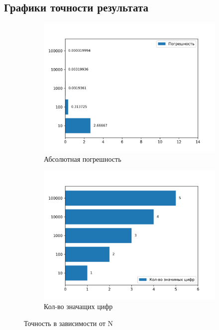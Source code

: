 \documentclass[a4paper,12pt]{article}
\begin{document}
\subsection{Графики точности результата}
\begin{figure}[H]
\centering
\begin{subfigure}{.5\textwidth}
  \centering
  \includegraphics[width=\linewidth]{plots/series_error.png}
  \caption{Абсолютная погрешность}
  \label{fig:sub1}
\end{subfigure}%
\begin{subfigure}{.5\textwidth}
  \centering
  \includegraphics[width=\linewidth]{plots/series_n_digits.png}
  \caption{Кол-во значащих цифр}
  \label{fig:sub2}
\end{subfigure}
\caption{Точность в зависимости от N}
\label{fig:test}
\end{figure}
\end{document}

